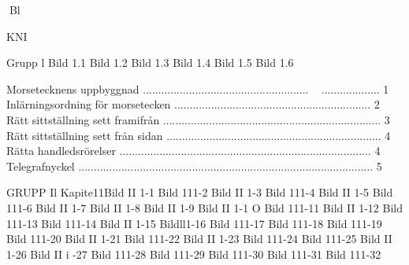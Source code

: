Bl

KNI

Grupp l
Bild 1.1
Bild 1.2
Bild 1.3
Bild 1.4
Bild 1.5
Bild 1.6

Morsetecknens uppbyggnad ...................................................... ~ ................... 1
Inlärningsordning för morsetecken ................................................................ 2
Rätt sittställning sett framifrån ....................................................................... 3
Rätt sittställning sett från sidan ...................................................................... 4
Rätta handledsrörelser .................................................................................. 4
Telegrafnyckel ................................................................................................ 5

GRUPP Il
Kapite11Bild II 1-1
Bild 111-2
Bild II 1-3
Bild 111-4
Bild II 1-5
Bild 111-6
Bild II 1-7
Bild II 1-8
Bild II 1-9
Bild II 1-1 O
Bild 111-11
Bild II 1-12
Bild 111-13
Bild 111-14
Bild II 1-15
Bildll1-16
Bild 111-17
Bild 111-18
Bild 111-19
Bild 111-20
Bild II 1-21
Bild 111-22
Bild II 1-23
Bild 111-24
Bild 111-25
Bild II 1-26
Bild II i -27
Bild 111-28
Bild 111-29
Bild 111-30
Bild 111-31
Bild 111-32

